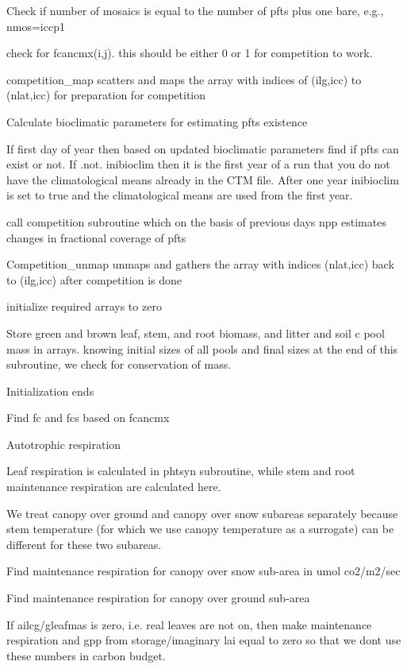 Check if number of mosaics is equal to the number of pfts plus one bare, e.\+g., nmos=iccp1

check for fcancmx(i,j). this should be either 0 or 1 for competition to work.

competition\+\_\+map scatters and maps the array with indices of (ilg,icc) to (nlat,icc) for preparation for competition

Calculate bioclimatic parameters for estimating pfts existence

If first day of year then based on updated bioclimatic parameters find if pfts can exist or not. If .not. inibioclim then it is the first year of a run that you do not have the climatological means already in the C\+T\+M file. After one year inibioclim is set to true and the climatological means are used from the first year.

call competition subroutine which on the basis of previous day\textquotesingle{}s npp estimates changes in fractional coverage of pfts

Competition\+\_\+unmap unmaps and gathers the array with indices (nlat,icc) back to (ilg,icc) after competition is done

initialize required arrays to zero

Store green and brown leaf, stem, and root biomass, and litter and soil c pool mass in arrays. knowing initial sizes of all pools and final sizes at the end of this subroutine, we check for conservation of mass.

Initialization ends

Find fc and fcs based on fcancmx

Autotrophic respiration

Leaf respiration is calculated in phtsyn subroutine, while stem and root maintenance respiration are calculated here.

We treat canopy over ground and canopy over snow subareas separately because stem temperature (for which we use canopy temperature as a surrogate) can be different for these two subareas.

Find maintenance respiration for canopy over snow sub-\/area in umol co2/m2/sec

Find maintenance respiration for canopy over ground sub-\/area

If ailcg/gleafmas is zero, i.\+e. real leaves are not on, then make maintenance respiration and gpp from storage/imaginary lai equal to zero so that we don\textquotesingle{}t use these numbers in carbon budget.

